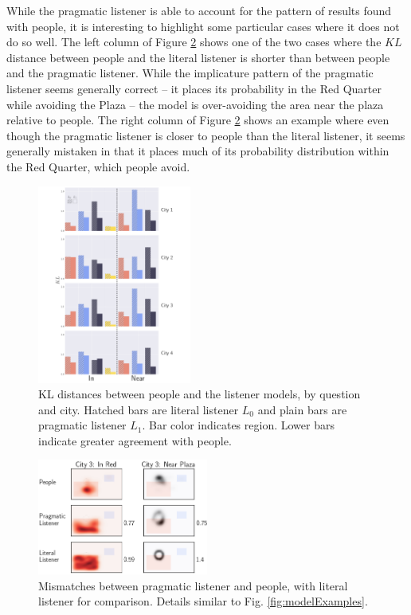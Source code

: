 \documentclass[10pt,letterpaper]{article}
\begin{document}
While the pragmatic listener is able to account for the pattern of results found with people, it is interesting to highlight some particular cases where it does not do so well. The left column of Figure \ref{fig:modelProbs} shows one of the two cases where the $KL$ distance between people and the literal listener is shorter than between people and the pragmatic listener.  While the implicature pattern of the pragmatic listener seems generally correct -- it places its probability in the Red Quarter while avoiding the Plaza -- the model is over-avoiding the area near the plaza relative to people. The right column of Figure \ref{fig:modelProbs} shows an example where even though the pragmatic listener is closer to people than the literal listener, it seems generally mistaken in that it places much of its probability distribution within the Red Quarter, which people avoid. 

\begin{figure}[!tb]
\center
\includegraphics[width=0.45\textwidth]{figures/KL.pdf}
\caption{KL distances between people and the listener models, by question and city. Hatched bars are literal listener $L_0$ and plain bars are  pragmatic listener $L_1$. Bar color indicates region. Lower bars indicate greater agreement with people.}
\label{fig:KL}
\end{figure}

\begin{figure}[!tbh]
\center
\includegraphics[width=0.5\textwidth]{figures/Figure5.png}
\caption{Mismatches between pragmatic listener and people, with literal listener for comparison. Details similar to Fig. \ref{fig:modelExamples}.}
\label{fig:modelProbs}
\end{figure}
\end{document}
